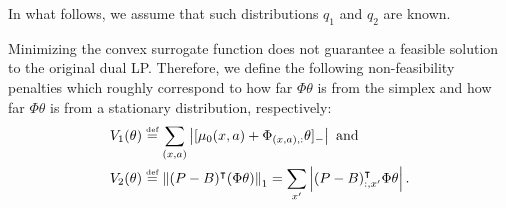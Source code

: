 \documentclass[11pt]{article}
\newcommand{\df}{\stackrel{\mbox{\rm\tiny def}}{=}}
\begin{document}
 In what follows, we assume that such distributions $q_1$ and $q_2$ are known.

Minimizing the convex surrogate function does not guarantee a feasible solution to the original dual LP. Therefore, we define the following non-feasibility penalties which roughly correspond to how far $\Phi\theta$ is from the simplex and how far $\Phi\theta$ is from a stationary distribution, respectively:
\begin{align*}
  V_1(\theta) & \df \sum_{(x,a)} \abs{ [\mu_0(x,a) + \Phi_{(x,a),:}\theta]_{-}} \text{ and }\\
  V_2(\theta) & \df \norm{(P-B)^\top(\Phi\theta)}_1
                = \sum_{x'} \abs{(P- B)_{:,x'}^\top \Phi \theta }.
\end{align*}
\end{document}
